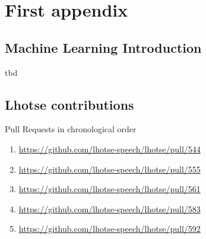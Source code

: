\documentclass[bsc,frontabs,parskip,deptreport]{infthesis}
\begin{document}
\appendix
\chapter{First appendix}
\section{Machine Learning Introduction}\label{sec:ml-intro}
tbd 

\section{Lhotse contributions}
Pull Requests in chronological order 
\begin{enumerate}
    \item \url{https://github.com/lhotse-speech/lhotse/pull/544}
    \item \url{https://github.com/lhotse-speech/lhotse/pull/555}
    \item \url{https://github.com/lhotse-speech/lhotse/pull/561}
    \item \url{https://github.com/lhotse-speech/lhotse/pull/583}
    \item \url{https://github.com/lhotse-speech/lhotse/pull/592}
\end{enumerate}
%
\end{document}
